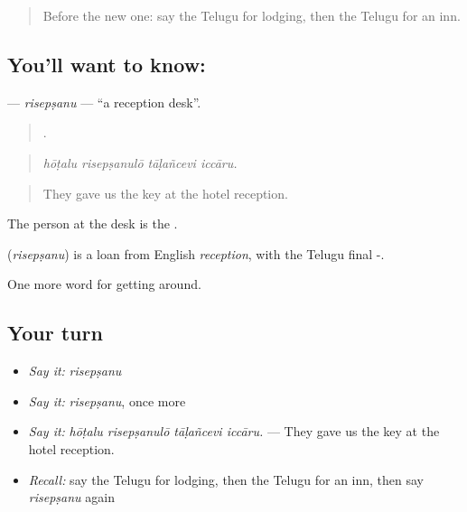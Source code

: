 \label{lesson:TE-C457-risepsanu}



\begin{quote}
Before the new one: say the Telugu for lodging, then the Telugu for an inn.
\end{quote}

\subsection*{You'll want to know: }
\textbf{} — \emph{risepṣanu} — \textquotedblleft{}a reception desk\textquotedblright{}.

\begin{quote}
   .
\end{quote}

\begin{quote}
\emph{hōṭalu risepṣanulō tāḷañcevi iccāru.}
\end{quote}

\begin{quote}
They gave us the key at the hotel reception.
\end{quote}

The person at the desk is the .

\begin{cousinweb}
\textbf{} (\emph{risepṣanu}) is a loan from English \emph{reception}, with the Telugu final -.
\end{cousinweb}

\begin{grammarlens}[title={What you've built}]
One more word for getting around.
\end{grammarlens}

\subsection*{Your turn}
\begin{itemize}
\raggedright
  \item \emph{Say it:} \emph{risepṣanu}
  \item \emph{Say it:} \emph{risepṣanu}, once more
  \item \emph{Say it:} \emph{hōṭalu risepṣanulō tāḷañcevi iccāru.} — They gave us the key at the hotel reception.
  \item \emph{Recall:} say the Telugu for lodging, then the Telugu for an inn, then say \emph{risepṣanu} again
\end{itemize}


